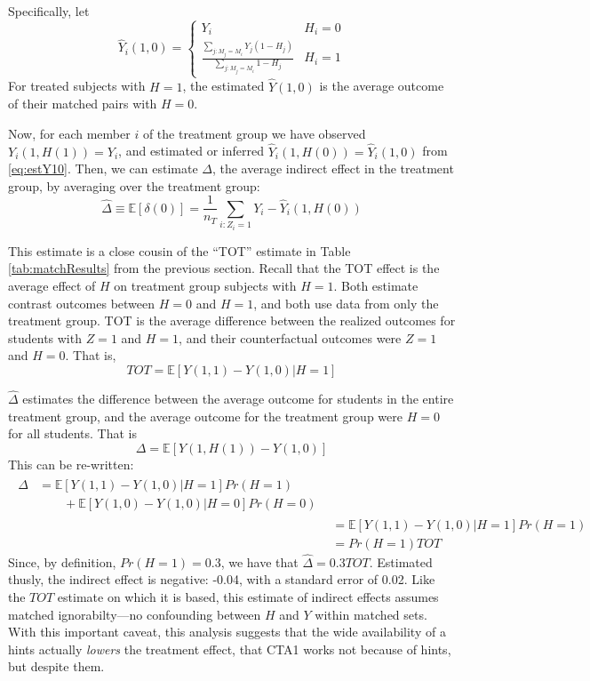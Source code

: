 \documentclass{article}\usepackage[]{graphicx}\usepackage[]{color}
\newcommand{\EE}{\mathbb{E}}
\begin{document}
Specifically, let
\begin{equation}\label{eq:estY10}
\hat{Y}_i(1,0)=\begin{cases}
 Y_i & H_i=0\\[3ex]
\frac{\displaystyle\sum_{j:M_j=M_i}
  Y_j(1-H_j)}{\displaystyle\sum_{j:M_j=M_i} 1-H_j} & H_i=1
\end{cases}
\end{equation}
For treated subjects with $H=1$, the estimated $\hat{Y}(1,0)$ is the
average outcome of their matched pairs with $H=0$.

Now, for each member $i$ of the treatment group we have observed
$Y_i(1,H(1))=Y_i$, and estimated or inferred
$\hat{Y}_i(1,H(0))=\hat{Y}_i(1,0)$ from \eqref{eq:estY10}.
Then, we can estimate $\Delta$, the average indirect effect in the
treatment group, by averaging over the treatment group:
\begin{equation*}
 \hat{\Delta}\equiv\widehat{\EE[\delta(0)]}=\frac{1}{n_T}\displaystyle\sum_{i:Z_i=1} Y_i-\hat{Y}_i(1,H(0))
\end{equation*}


This estimate is a close cousin of the ``TOT'' estimate in Table
\ref{tab:matchResults} from the previous section.
Recall that the TOT effect is the average effect of $H$ on treatment
group subjects with $H=1$.
Both estimate contrast outcomes between $H=0$ and $H=1$, and both use
data from only the treatment group.
TOT is the average difference between the realized outcomes for students
with $Z=1$ and $H=1$, and their counterfactual outcomes were $Z=1$ and $H=0$.
That is,
\begin{equation*}
TOT=\EE[Y(1,1)-Y(1,0)|H=1]
\end{equation*}

$\hat{\Delta}$ estimates the difference between the average outcome
for students in the entire treatment group, and the average outcome
for the treatment group were $H=0$ for all students.
That is
\begin{equation*}
\Delta=\EE[Y(1,H(1))-Y(1,0)]
\end{equation*}
This can be re-written:
\begin{align*}
\begin{split}
\Delta&=\EE[Y(1,1)-Y(1,0)|H=1]Pr(H=1)\\
&\qquad +\EE[Y(1,0)-Y(1,0)|H=0]Pr(H=0)
\end{split}
\\[2ex]
&=\EE[Y(1,1)-Y(1,0)|H=1]Pr(H=1)\\
&=Pr(H=1)TOT
\end{align*}
Since, by definition, $Pr(H=1)=$0.3, we have that
$\hat{\Delta}=$0.3$TOT$.
Estimated thusly, the indirect effect is negative: -0.04, with
a standard error of 0.02.
Like the $TOT$ estimate on which it is based, this estimate of indirect effects assumes matched ignorabilty---no confounding between $H$ and $Y$ within matched sets.
With this important caveat, this analysis suggests that the
wide availability of a hints
actually \emph{lowers} the treatment effect, that CTA1 works not
because of hints, but despite them.
\end{document}
